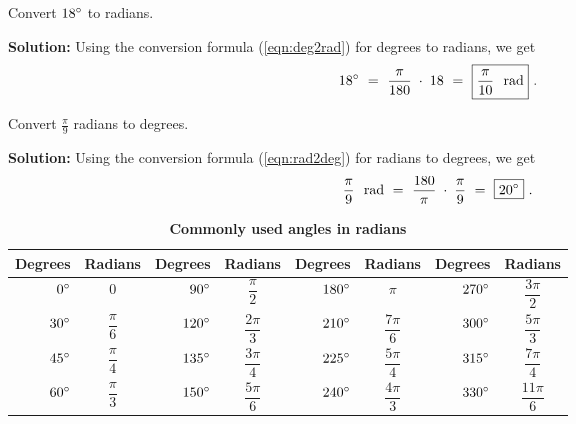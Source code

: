 \begin{exmp}
 Convert $18^\circ$ to radians.\vspace{1mm}
 \par\noindent\textbf{Solution:} Using the conversion formula (\ref{eqn:deg2rad}) for degrees to
 radians, we get
 \begin{displaymath}
  18^\circ ~=~ \frac{\pi}{180} \;\cdot\; 18 ~=~ \boxed{\frac{\pi}{10} ~~\text{rad}} ~.
 \end{displaymath}
\end{exmp}\vspace{-6mm}
\begin{exmp}
 Convert $\frac{\pi}{9}$ radians to degrees.\vspace{1mm}
 \par\noindent\textbf{Solution:} Using the conversion formula (\ref{eqn:rad2deg}) for radians to
 degrees, we get
 \begin{displaymath}
  \frac{\pi}{9} ~~\text{rad} ~=~ \frac{180}{\pi} \;\cdot\; \frac{\pi}{9} ~=~ \boxed{20^\circ} ~.
 \end{displaymath}
\end{exmp}\vspace{-3mm}
\divider
\vspace{-3mm}

\begin{table}[h]\centering
\caption{\quad \textbf{Commonly used angles in radians}}\vspace{3mm}
\renewcommand\arraystretch{2.0}
\begin{tabular}{|rc|rc|rc|rc|}
\hline
Degrees & Radians & Degrees & Radians & Degrees & Radians & Degrees & Radians\\
\hline
$0^\circ$ & $0$ & $90^\circ$ & $\dfrac{\pi}{2}$ & $180^\circ$ & $\pi$ & $270^\circ$ & $\dfrac{3\pi}{2}$\\[4pt]
\hline
$30^\circ$ & $\dfrac{\pi}{6}$ & $120^\circ$ & $\dfrac{2\pi}{3}$ & $210^\circ$ & $\dfrac{7\pi}{6}$ & $300^\circ$ & $\dfrac{5\pi}{3}$\\[4pt]
\hline
$45^\circ$ & $\dfrac{\pi}{4}$ & $135^\circ$ & $\dfrac{3\pi}{4}$ & $225^\circ$ & $\dfrac{5\pi}{4}$ & $315^\circ$& $\dfrac{7\pi}{4}$\\[4pt]
\hline
$60^\circ$ & $\dfrac{\pi}{3}$ & $150^\circ$ & $\dfrac{5\pi}{6}$ & $240^\circ$ & $\dfrac{4\pi}{3}$ & $330^\circ$ & $\dfrac{11\pi}{6}$\\[4pt]
\hline
\end{tabular}\label{tbl:radians}
\end{table}\vspace{-1mm}

